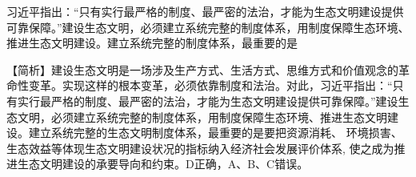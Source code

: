 \question 习近平指出：``只有实行最严格的制度、最严密的法治，才能为生态文明建设提供可靠保障。''建设生态文明，必须建立系统完整的制度体系，用制度保障生态环境、推进生态文明建设。建立系统完整的制度体系，最重要的是
\par{}
\begin{solution}【简析】建设生态文明是一场涉及生产方式、生活方式、思维方式和价值观念的革命性变革。实现这样的根本变革，必须依靠制度和法治。对此，习近平指出：``只有实行最严格的制度、最严密的法治，才能为生态文明建设提供可靠保障。''建设生态文明，必须建立系统完整的制度体系，用制度保障生态环境、推进生态文明建设。建立系统完整的生态文明制度体系，最重要的是要把资源消耗、
环境损害、生态效益等体现生态文明建设状况的指标纳入经济社会发展评价体系,
使之成为推进生态文明建设的承要导向和约束。D正确，A、B、C错误。
\end{solution}
